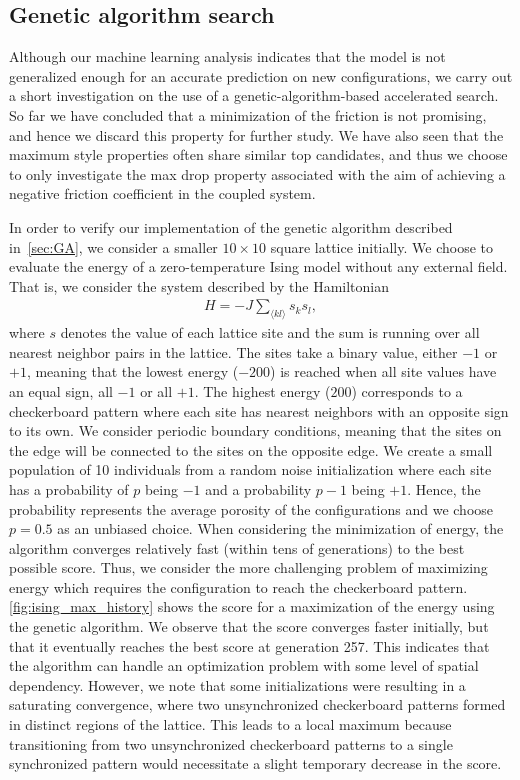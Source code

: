 \subsection{Genetic algorithm search}
Although our machine learning analysis indicates that the model is not generalized enough for an accurate prediction on new configurations, we carry out a short investigation on the use of a genetic-algorithm-based accelerated search. So far we have concluded that a minimization of the friction is not
promising, and hence we discard this property for further study. We have also
seen that the maximum style properties often share similar top candidates, and
thus we choose to only investigate the max drop property associated with the
aim of achieving a negative friction coefficient in the coupled system. 

In order to verify our implementation of the genetic algorithm described
in~\cref{sec:GA}, we consider a smaller $10 \times 10$ square lattice initially. We choose to
evaluate the energy of a zero-temperature Ising model without any external
field. That is, we consider the system described by the Hamiltonian 
\begin{align}
  H = -J\sum_{\langle kl \rangle} s_k s_l,
  \label{eq:H_ising}
\end{align}
where $s$ denotes the value of each lattice site and the sum is running over all
nearest neighbor pairs in the lattice. The sites take a binary value, either
$-1$ or $+1$, meaning that the lowest energy ($-200$) is reached when all site values have an equal sign, all $-1$ or all $+1$. The highest energy ($200$) corresponds to a checkerboard pattern where each site has nearest neighbors with an opposite sign to its own. We consider periodic boundary conditions, meaning that the sites on
the edge will be connected to the sites on the opposite edge. We create a small
population of 10 individuals from a random noise initialization where each site
has a probability of $p$ being $-1$ and a probability $p-1$ being $+1$. Hence, the probability
represents the average porosity of the configurations and we choose $p = 0.5$ as an unbiased choice. When
considering the minimization of energy, the algorithm converges relatively fast (within tens of generations) to the best possible score. Thus, we consider the more challenging problem of maximizing energy which requires the configuration to reach the checkerboard pattern. \cref{fig:ising_max_history} shows the score for a maximization of the energy using the genetic algorithm. We observe that the score converges faster initially, but that it eventually reaches the best score at generation 257. This indicates that the algorithm can handle an optimization problem with some level of spatial dependency. However, we note that some initializations were resulting in a saturating convergence, where two unsynchronized checkerboard patterns formed in distinct regions of the lattice. This leads to a local maximum because transitioning from two unsynchronized checkerboard patterns to a single synchronized pattern would necessitate a slight temporary decrease in the score.

